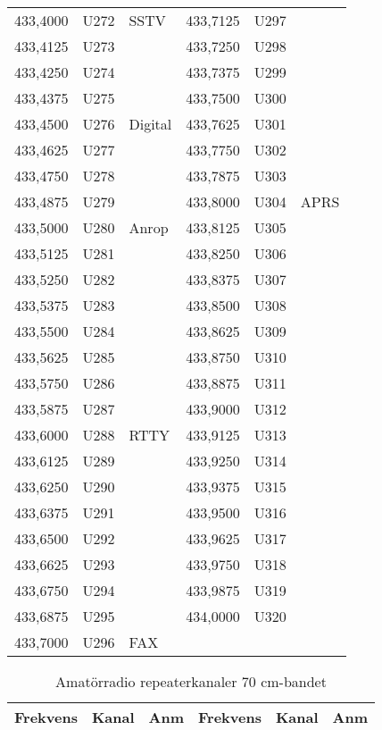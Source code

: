 {\begin{longtable}{rrl|rrl}
433,4000 & U272 & SSTV    & 433,7125 & U297 &      \\
433,4125 & U273 &         & 433,7250 & U298 &      \\
433,4250 & U274 &         & 433,7375 & U299 &      \\
433,4375 & U275 &         & 433,7500 & U300 &      \\
433,4500 & U276 & Digital & 433,7625 & U301 &      \\
433,4625 & U277 &         & 433,7750 & U302 &      \\
433,4750 & U278 &         & 433,7875 & U303 &      \\
433,4875 & U279 &         & 433,8000 & U304 & APRS \\
433,5000 & U280 & Anrop   & 433,8125 & U305 &      \\
433,5125 & U281 &         & 433,8250 & U306 &      \\
433,5250 & U282 &         & 433,8375 & U307 &      \\
433,5375 & U283 &         & 433,8500 & U308 &      \\
433,5500 & U284 &         & 433,8625 & U309 &      \\
433,5625 & U285 &         & 433,8750 & U310 &      \\
433,5750 & U286 &         & 433,8875 & U311 &      \\
433,5875 & U287 &         & 433,9000 & U312 &      \\
433,6000 & U288 & RTTY    & 433,9125 & U313 &      \\
433,6125 & U289 &         & 433,9250 & U314 &      \\
433,6250 & U290 &         & 433,9375 & U315 &      \\
433,6375 & U291 &         & 433,9500 & U316 &      \\
433,6500 & U292 &         & 433,9625 & U317 &      \\
433,6625 & U293 &         & 433,9750 & U318 &      \\
433,6750 & U294 &         & 433,9875 & U319 &      \\
433,6875 & U295 &         & 434,0000 & U320 &      \\
433,7000 & U296 & FAX     &          &      &      \\

\end{longtable}

\begin{longtable}{rrl|rrl}
\caption{Amatörradio repeaterkanaler 70 cm-bandet}\\
\textbf{Frekvens} & \textbf{Kanal} & \textbf{Anm}
&  \textbf{Frekvens} & \textbf{Kanal} & \textbf{Anm} \\ \hline


\end{longtable}}

